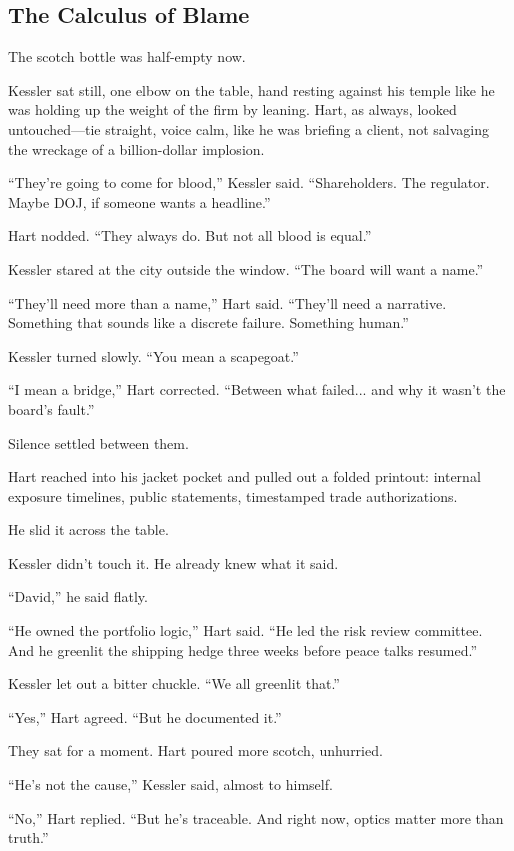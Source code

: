
\subsection{The Calculus of Blame}

The scotch bottle was half-empty now.

Kessler sat still, one elbow on the table, hand resting against his temple like he was 
holding up the weight of the firm by leaning. Hart, as always, looked untouched—tie 
straight, voice calm, like he was briefing a client, not salvaging the wreckage of a 
billion-dollar implosion.

``They’re going to come for blood,'' Kessler said. ``Shareholders. The regulator. Maybe 
DOJ, if someone wants a headline.''

Hart nodded. ``They always do. But not all blood is equal.''

Kessler stared at the city outside the window. ``The board will want a name.''

``They’ll need more than a name,'' Hart said. ``They’ll need a narrative. Something 
that sounds like a discrete failure. Something human.''

Kessler turned slowly. ``You mean a scapegoat.''

``I mean a bridge,'' Hart corrected. ``Between what failed... and why it wasn’t the 
board’s fault.''

Silence settled between them.

Hart reached into his jacket pocket and pulled out a folded printout: internal 
exposure timelines, public statements, timestamped trade authorizations.

He slid it across the table.

Kessler didn’t touch it. He already knew what it said.

``David,'' he said flatly.

``He owned the portfolio logic,'' Hart said. ``He led the risk review committee. And 
he greenlit the shipping hedge three weeks before peace talks resumed.''

Kessler let out a bitter chuckle. ``We all greenlit that.''

``Yes,'' Hart agreed. ``But he documented it.''

They sat for a moment. Hart poured more scotch, unhurried.

``He’s not the cause,'' Kessler said, almost to himself.

``No,'' Hart replied. ``But he’s traceable. And right now, optics matter more than truth.''

